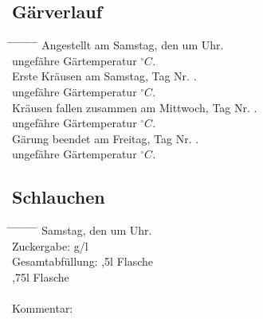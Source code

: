 \documentclass[12pt,oneside,a4paper]{scrartcl}
\begin{document}
{\subsection*{Gärverlauf}
	\begin{tabbing}
		\hspace{1cm} \= \hspace{1cm} \= \hspace{1cm} \= \hspace{1cm} \= \hspace{1cm} \= \hspace{1cm} \= \hspace{1cm} \= \hspace{1cm} \= \kill
		\> Angestellt am Samstag, den  um  Uhr.\\
		\> \> ungefähre Gärtemperatur  $^\circ C$.\\
		\> Erste Kräusen am Samstag,  Tag Nr. .\\
		\> \> ungefähre Gärtemperatur $^\circ C$.\\
		\> Kräusen fallen zusammen am Mittwoch, Tag Nr. .\\
		\> \> ungefähre Gärtemperatur $^\circ C$.\\
		\> Gärung beendet am Freitag, Tag Nr. .\\
		\> \> ungefähre Gärtemperatur $^\circ C$.
	\end{tabbing}
%
\subsection*{Schlauchen}
	\begin{tabbing}
		\hspace{1cm} \= \hspace{1cm} \= \hspace{1cm} \= \hspace{1cm} \= \hspace{1cm} \= \hspace{1cm} \= \hspace{1cm} \= \hspace{1cm} \= \kill
		\> Samstag, den  um  Uhr.\\
		\> Zuckergabe:  g/l\\
		\> Gesamtabfüllung: \> \> \> \>  ,5l Flasche\\
		\> \> \> \> \>  ,75l Flasche\\
		\\
		\> Kommentar: \>\>\>\\
	\end{tabbing}
%
}
\end{document}
